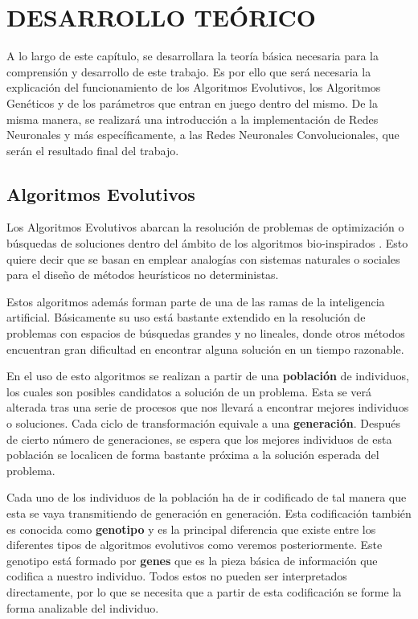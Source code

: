 %
\chapter{DESARROLLO TEÓRICO}
\label{sec:desarrollo teórico}

A lo largo de este capítulo, se desarrollara la teoría básica necesaria para la comprensión y desarrollo de este trabajo. Es por ello que será necesaria la explicación del funcionamiento de los Algoritmos Evolutivos, los Algoritmos Genéticos y de los parámetros que entran en juego dentro del mismo. De la misma manera, se realizará una introducción a la implementación de Redes Neuronales y más específicamente, a las Redes Neuronales Convolucionales, que serán el resultado final del trabajo.

\section{Algoritmos Evolutivos}

Los Algoritmos Evolutivos abarcan la resolución de problemas de optimización o búsquedas de soluciones dentro del ámbito de los algoritmos bio-inspirados \cite{10.5555/2432058}. Esto quiere decir que se basan en emplear analogías con sistemas naturales o sociales para el diseño de métodos heurísticos no deterministas.

Estos algoritmos además forman parte de una de las ramas de la inteligencia artificial. Básicamente su uso está bastante extendido en la resolución de problemas con espacios de búsquedas grandes y no lineales, donde otros métodos encuentran gran dificultad en encontrar alguna solución en un tiempo razonable.

En el uso de esto algoritmos se realizan a partir de una \textbf{población} de individuos, los cuales son posibles candidatos a solución de un problema. Esta se verá alterada tras una serie de procesos que nos llevará a encontrar mejores individuos o soluciones. Cada ciclo de transformación equivale a una \textbf{generación}. Después de cierto número de generaciones, se espera que los mejores individuos de esta población se localicen de forma bastante próxima a la solución esperada del problema.

Cada uno de los individuos de la población ha de ir codificado de tal manera que esta se vaya transmitiendo de generación en generación. Esta codificación también es conocida como \textbf{genotipo} y es la principal diferencia que existe entre los diferentes tipos de algoritmos evolutivos como veremos posteriormente. Este genotipo está formado por \textbf{genes} que es la pieza básica de información que codifica a nuestro individuo. Todos estos no pueden ser interpretados directamente, por lo que se necesita que a partir de esta codificación se forme la forma analizable del individuo.

